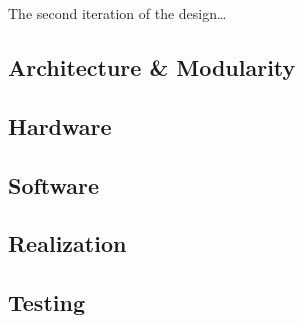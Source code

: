 \IEEEPARstart
{T}{he} second iteration of the design\dots

\subsection{Architecture \& Modularity}


\subsection{Hardware}


\subsection{Software}




\subsection{Realization}


\subsection{Testing}
